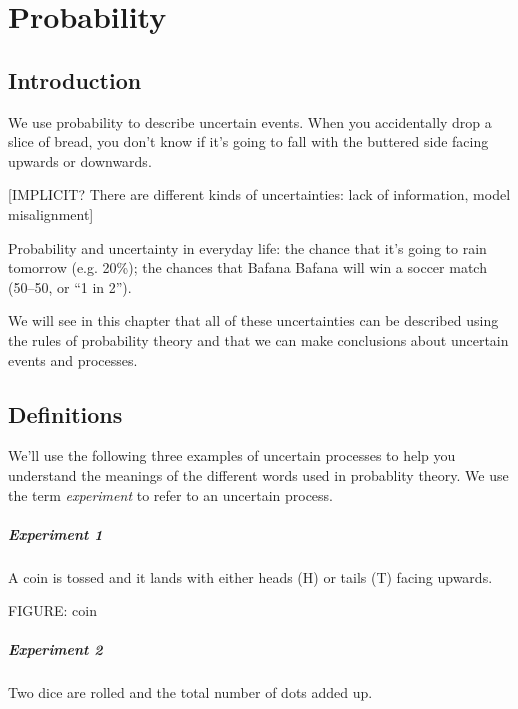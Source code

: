 \documentclass[a4paper,11pt]{report}
\begin{document}
\chapter{Probability}

\section{Introduction}

We use probability to describe uncertain events. When you accidentally
drop a slice of bread, you don't know if it's going to fall with the
buttered side facing upwards or downwards.

[IMPLICIT? There are different kinds of uncertainties: lack of
information, model misalignment]

Probability and uncertainty in everyday life: the chance that it's
going to rain tomorrow (e.g. 20\%); the chances that Bafana Bafana
will win a soccer match (50--50, or ``1 in 2'').

We will see in this chapter that all of these uncertainties can be
described using the rules of probability theory and that we can make
conclusions about uncertain events and processes.

\section{Definitions}

We'll use the following three examples of uncertain processes to help
you understand the meanings of the different words used in probablity
theory. We use the term {\em experiment} to refer to an uncertain process.

\paragraph{Experiment 1} A coin is tossed and it lands with either heads
(H) or tails (T) facing upwards.

FIGURE: coin

\paragraph{Experiment 2} Two dice are rolled and the total number of dots
added up.

\begin{center}
\end{center}
\end{document}
